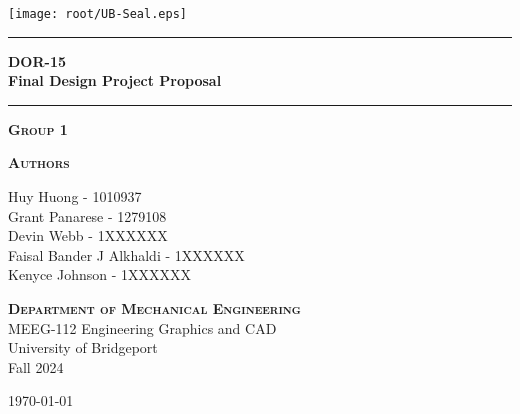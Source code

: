
\begin{titlepage}
\begin{center}
\vspace{1 cm}
\texttt{[image: root/UB-Seal.eps]}~\\[1 cm]
\vspace{1 cm}

\hrule
\vspace{.5 cm}
{ \huge \bfseries DOR-15}
\vspace{.5 cm}
\\{\huge \bfseries Final Design Project Proposal} %
\vspace{.5 cm}

\hrule
\vspace{1 cm}

\textsc{\textbf{Group 1}} \\

\vspace{.5 cm}

\textsc{\textbf{Authors}}\\ %
\centering

Huy Huong - 1010937\\
Grant Panarese - 1279108\\
Devin Webb - 1XXXXXX\\
Faisal Bander J Alkhaldi - 1XXXXXX\\
Kenyce Johnson - 1XXXXXX\\


\vspace{.5 cm}

\textsc{\textbf{Department of Mechanical Engineering}}\\
\centering
    MEEG-112 Engineering Graphics and CAD \\
    University of Bridgeport \\
    Fall 2024 \\

\vspace{1 cm}

\centering \today %
\end{center}
\end{titlepage}